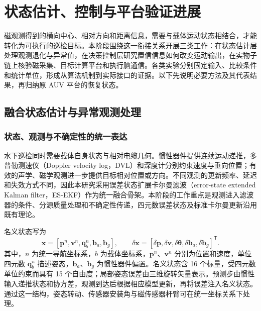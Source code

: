\chapter{状态估计、控制与平台验证进展}\label{ch:middle-systems}

磁观测得到的横向中心、相对方向和距离信息，需要与载体运动状态相结合，才能转化为可执行的巡检目标。本阶段围绕这一衔接关系开展三类工作：在状态估计层处理观测退化与异常值，在决策控制层研究置信信息如何改变运动输出，在实物子链上核验磁采集、目标计算平台和执行脑通信。各类实验分别固定输入、比较条件和统计单位，形成从算法机制到实际接口的证据。以下先说明必要方法及其代表结果，再归纳原 AUV 平台的恢复状态。

\section{融合状态估计与异常观测处理}\label{sec:middle-estimation}

\subsection{状态、观测与不确定性的统一表达}

水下巡检同时需要载体自身状态与相对电缆几何。惯性器件提供连续运动递推，多普勒测速仪（Doppler velocity log，DVL）和深度计分别约束速度与垂向位置；有效的声学、磁学观测进一步提供目标相对位置或方向。不同观测的更新频率、延迟和失效方式不同，因此本研究采用误差状态扩展卡尔曼滤波（error-state extended Kalman filter，ES-EKF）作为统一融合骨架\cite{sola2017quaternion,madyastha2011eskf}。本阶段的工作重点是观测进入滤波器的条件、分源质量处理和不确定性传递，四元数误差状态及标准卡尔曼更新沿用既有理论。

名义状态写为
\begin{equation}
 \boldsymbol{x}=\left[\boldsymbol{p}^{n},\boldsymbol{v}^{n},
 \boldsymbol{q}_{b}^{n},\boldsymbol{b}_{a},\boldsymbol{b}_{g}\right],
 \qquad
 \delta\boldsymbol{x}=\left[\delta\boldsymbol{p},\delta\boldsymbol{v},
 \delta\boldsymbol{\theta},\delta\boldsymbol{b}_{a},\delta\boldsymbol{b}_{g}\right]^{\mathsf T}.
\end{equation}
其中，$n$ 为统一导航坐标系，$b$ 为载体坐标系，$\boldsymbol{p}^{n}$、$\boldsymbol{v}^{n}$ 分别为位置和速度，单位四元数 $\boldsymbol{q}_{b}^{n}$ 描述姿态，$\boldsymbol{b}_{a}$、$\boldsymbol{b}_{g}$ 为惯性器件偏置。名义状态含 16 个标量，受四元数单位约束而具有 15 个自由度；局部姿态误差由三维旋转矢量表示。预测步由惯性输入递推状态和协方差，观测到达后根据相应模型更新，再将误差注入名义状态。通过这一结构，姿态转动、传感器安装角与磁传感器杆臂可在统一坐标关系下处理。

